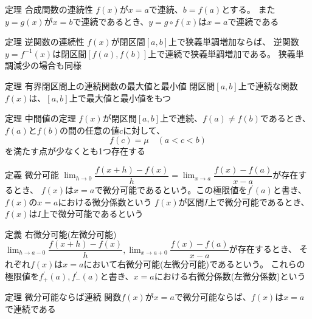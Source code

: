 \documentclass[a4paper]{jarticle}
\begin{document}
    \begin{itembox}[l]{定理 合成関数の連続性}
        $f(x)$が$x=a$で連続、$b=f(a)$とする。
        また$y=g(x)$が$x=b$で連続であるとき、$y=g \circ f(x)$は$x=a$で連続である
    \end{itembox}

    \begin{itembox}[l]{定理 逆関数の連続性}
        $f(x)$が閉区間$[a, b]$上で狭義単調増加ならば、
        逆関数$y=f^{-1}(x)$は閉区間$[f(a), f(b)]$上で連続で狭義単調増加である。
        狭義単調減少の場合も同様
    \end{itembox}

    \begin{itembox}[l]{定理 有界閉区間上の連続関数の最大値と最小値}
        閉区間$[a, b]$上で連続な関数$f(x)$は、$[a, b]$上で最大値と最小値をもつ
    \end{itembox}

    \begin{itembox}[l]{定理 中間値の定理}
        $f(x)$が閉区間$[a, b]$上で連続、$f(a) \neq f(b)$であるとき、
        $f(a)$と$f(b)$の間の任意の値$c$に対して、
        \[f(c) = \mu \quad (a < c < b)\]
        を満たす点が少なくとも1つ存在する
    \end{itembox}

    \begin{itembox}[l]{定義 微分可能}
        $\lim_{h \to 0} \dfrac{f(x+h) - f(x)}{h} = \lim_{x \to a} \dfrac{f(x) - f(a)}{x - a}$が存在するとき、
        $f(x)$は$x=a$で微分可能であるという。この極限値を$f^{\prime}(a)$と書き、$f(x)$の$x=a$における微分係数という
        $f(x)$が区間$I$上で微分可能であるとき、$f(x)$は$I$上で微分可能であるという
    \end{itembox}


    \begin{itembox}[l]{定義 右微分可能(左微分可能)}
        $\lim_{h \to a-0} \dfrac{f(x+h) - f(x)}{h}, \lim_{x \to a+0} \dfrac{f(x) - f(a)}{x - a}$が存在するとき、
        それぞれ$f(x)$は$x=a$において右微分可能(左微分可能)であるという。
        これらの極限値を$f^{\prime}_{+}(a), f^{\prime}_{-}(a)$と書き、$x=a$における右微分係数(左微分係数)という
    \end{itembox}

    \begin{itembox}[l]{定理 微分可能ならば連続}
        関数$f(x)$が$x=a$で微分可能ならば、$f(x)$は$x=a$で連続である
    \end{itembox}
\end{document}
